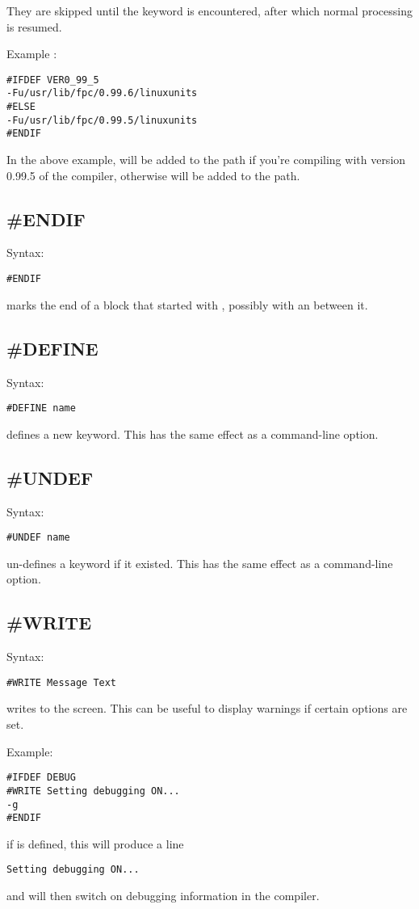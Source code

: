 \documentclass{book}
\begin{document}
They are skipped until the keyword  is
encountered, after which normal processing is resumed.

Example :
\begin{verbatim}
#IFDEF VER0_99_5
-Fu/usr/lib/fpc/0.99.6/linuxunits
#ELSE
-Fu/usr/lib/fpc/0.99.5/linuxunits
#ENDIF
\end{verbatim}
In the above example,  will be added to
the path if you're compiling with version 0.99.5 of the compiler,
otherwise  will be added to the path.

\subsection{\#ENDIF}
Syntax:
\begin{verbatim}
#ENDIF
\end{verbatim}
 marks the end of a block that started with ,
possibly with an  between it.

\subsection{\#DEFINE}
Syntax:
\begin{verbatim}
#DEFINE name
\end{verbatim}
 defines a new keyword. This has the same effect as a
  command-line option.

\subsection{\#UNDEF}
Syntax:
\begin{verbatim}
#UNDEF name
\end{verbatim}
 un-defines a keyword if it existed.
This has the same effect as a   command-line option.

\subsection{\#WRITE}
Syntax:
\begin{verbatim}
#WRITE Message Text
\end{verbatim}
 writes  to the screen.
This can be useful to display warnings if certain options are set.

Example:
\begin{verbatim}
#IFDEF DEBUG
#WRITE Setting debugging ON...
-g
#ENDIF
\end{verbatim}
if  is defined, this will produce a line
\begin{verbatim}
Setting debugging ON...
\end{verbatim}
and will then switch on debugging information in the compiler.
\end{document}
